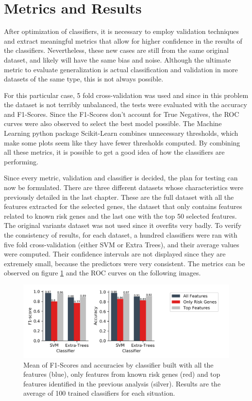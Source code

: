 \section{Metrics and Results}

After optimization of classifiers, it is necessary to employ validation techniques and extract meaningful metrics that allow for higher confidence in the results of the classifiers. Nevertheless, these new cases are still from the same original dataset, and likely will have the same bias and noise. Although the ultimate metric to evaluate generalization is actual classification and validation in more datasets of the same type, this is not always possible.

For this particular case, 5 fold cross-validation was used and since in this problem the dataset is not terribly unbalanced, the tests were evaluated with the accuracy and F1-Scores. Since the F1-Scores don't account for True Negatives, the \gls{ROC} curves were also observed to select the best model possible. The Machine Learning python package Scikit-Learn combines unnecessary thresholds, which make some plots seem like they have fewer thresholds computed. By combining all these metrics, it is possible to get a good idea of how the classifiers are performing.

Since every metric, validation and classifier is decided, the plan for testing can now be formulated. There are three different datasets whose characteristics were previously detailed in the last chapter. These are the full dataset with all the features extracted for the selected genes, the dataset that only contains features related to known risk genes and the last one with the top 50 selected features. The original variants dataset was not used since it overfits very badly. To verify the consistency of results, for each dataset, a hundred classifiers were ran with five fold cross-validation (either \gls{SVM} or Extra Trees), and their average values were computed. Their confidence intervals are not displayed since they are extremely small, because the predictors were very consistent. The metrics can be observed on figure \ref{fig:results} and the ROC curves on the following images.

\begin{figure}[h]
	\centering
	\includegraphics[width=\textwidth]{../images/results/class_results.png}
	\caption{Mean of F1-Scores and accuracies by classifier built with all the features (blue),
		only features from known risk genes (red) and top features identified in the previous
		analysis (silver). Results are the average of 100 trained classifiers for each situation.} 
	\label{fig:results}
\end{figure}

